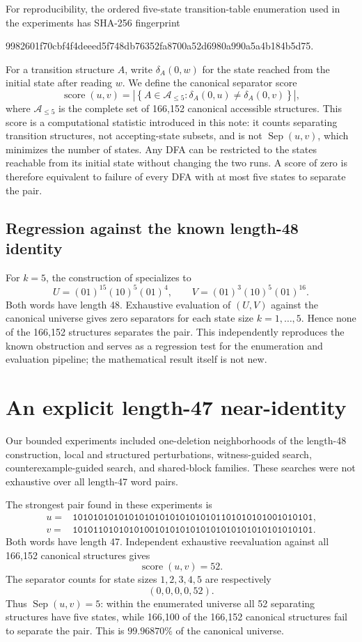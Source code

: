 \documentclass[10pt]{article}
\newcommand{\Sep}{\operatorname{Sep}}
\newcommand{\score}{\operatorname{score}}
\begin{document}
For reproducibility, the ordered five-state transition-table enumeration used in the experiments has SHA-256 fingerprint
\begin{center}
\small\ttfamily
9982601f70cbf4f4deeed5f748db76352fa8700a52d6980a990a5a4b184b5d75.
\end{center}
For a transition structure $A$, write $\delta_A(0,w)$ for the state reached from the initial state after reading $w$.  We define the canonical separator score
\[
\score(u,v)=\left|\left\{A\in\mathcal A_{\leq 5}:\delta_A(0,u)\neq\delta_A(0,v)\right\}\right|,
\]
where $\mathcal A_{\leq5}$ is the complete set of 166,152 canonical accessible structures.  This score is a computational statistic introduced in this note: it counts separating transition structures, not accepting-state subsets, and is not $\Sep(u,v)$, which minimizes the number of states.  Any DFA can be restricted to the states reachable from its initial state without changing the two runs.  A score of zero is therefore equivalent to failure of every DFA with at most five states to separate the pair.

\subsection{Regression against the known length-48 identity}
For $k=5$, the construction of \cite{BKSS2017} specializes to
\[
U=(01)^{15}(10)^5(01)^4,\qquad
V=(01)^3(10)^5(01)^{16}.
\]
Both words have length 48.  Exhaustive evaluation of $(U,V)$ against the canonical universe gives zero separators for each state size $k=1,\ldots,5$.  Hence none of the 166,152 structures separates the pair.  This independently reproduces the known obstruction and serves as a regression test for the enumeration and evaluation pipeline; the mathematical result itself is not new.

\section{An explicit length-47 near-identity}
Our bounded experiments included one-deletion neighborhoods of the length-48 construction, local and structured perturbations, witness-guided search, counterexample-guided search, and shared-block families.  These searches were not exhaustive over all length-47 word pairs.

The strongest pair found in these experiments is
\begin{align*}
u={}&\texttt{10101010101010101010101010101101010101001010101},\\
v={}&\texttt{10101101010101001010101010101010101010101010101}.
\end{align*}
Both words have length 47.  Independent exhaustive reevaluation against all 166,152 canonical structures gives
\[
\boxed{\score(u,v)=52}.
\]
The separator counts for state sizes $1,2,3,4,5$ are respectively
\[
(0,0,0,0,52).
\]
Thus $\Sep(u,v)=5$: within the enumerated universe all 52 separating structures have five states, while 166,100 of the 166,152 canonical structures fail to separate the pair.  This is $99.96870\%$ of the canonical universe.
\end{document}
